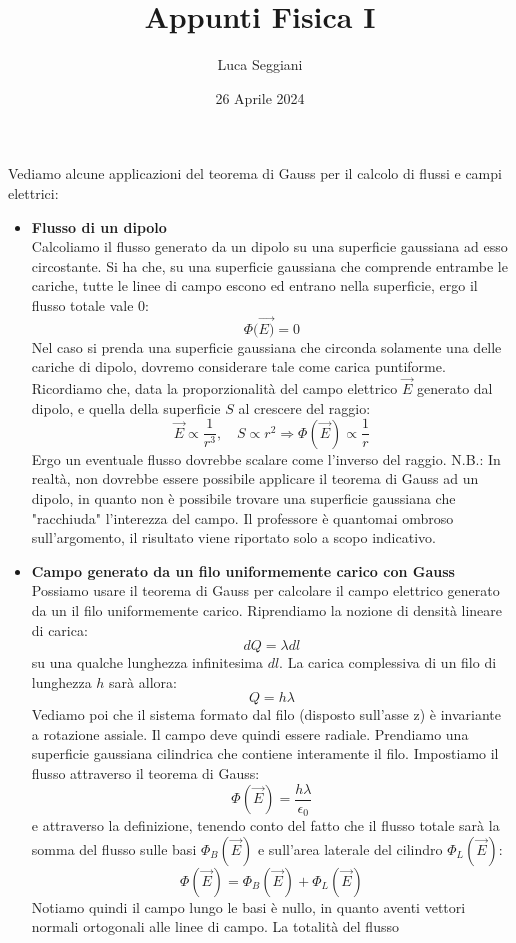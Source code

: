 \documentclass[a4paper,12pt]{article}
\title{Appunti Fisica I}
\author{Luca Seggiani}
\date{26 Aprile 2024}
\begin{document}
\maketitle
\par\medskip
Vediamo alcune applicazioni del teorema di Gauss per il calcolo di flussi e campi elettrici:
\begin{itemize}
  \item \textbf{Flusso di un dipolo} \\
Calcoliamo il flusso generato da un dipolo su una superficie gaussiana ad esso circostante. Si ha che, su una superficie
gaussiana che comprende entrambe le cariche, tutte le linee di campo escono ed entrano nella superficie, ergo il flusso
totale vale 0:
$$ \Phi(\vec{E)} = 0 $$
Nel caso si prenda una superficie gaussiana che circonda solamente una delle cariche di dipolo, dovremo considerare tale come carica
puntiforme. Ricordiamo che, data la proporzionalità del campo elettrico $\vec{E}$ generato dal dipolo, e quella della superficie $S$ al crescere
del raggio:
$$ \vec{E} \propto \frac{1}{r^3}, \quad S \propto r^2 \Rightarrow \Phi(\vec{E}) \propto \frac{1}{r} $$
Ergo un eventuale flusso dovrebbe scalare come l'inverso del raggio.
N.B.: In realtà, non dovrebbe essere possibile applicare il teorema di Gauss ad un dipolo, in quanto non è possibile
trovare una superficie gaussiana che "racchiuda" l'interezza del campo. Il professore è quantomai ombroso sull'argomento, il risultato
viene riportato solo a scopo indicativo.
\item \textbf{Campo generato da un filo uniformemente carico con Gauss} \\
Possiamo usare il teorema di Gauss per calcolare il campo elettrico generato da un il filo uniformemente carico. 
Riprendiamo la nozione di densità lineare di carica:
$$ dQ = \lambda dl $$
su una qualche lunghezza infinitesima $dl$. La carica complessiva di un filo di lunghezza $h$ sarà allora: 
$$ Q=h\lambda $$
Vediamo poi che il sistema formato dal filo (disposto sull'asse z) è invariante a rotazione assiale. Il campo
deve quindi essere radiale. Prendiamo una superficie gaussiana cilindrica che contiene interamente il filo.
Impostiamo il flusso attraverso il teorema di Gauss:
$$ \Phi(\vec{E}) = \frac{h\lambda}{\epsilon_0} $$
e attraverso la definizione, tenendo conto del fatto che il flusso totale sarà la somma del flusso sulle basi $\Phi_B(\vec{E})$ e sull'area
laterale del cilindro $\Phi_L(\vec{E})$:
$$ \Phi(\vec{E}) = \Phi_B(\vec{E}) + \Phi_L(\vec{E}) $$
Notiamo quindi il campo lungo le basi è nullo, in quanto aventi vettori normali ortogonali alle linee di campo. La totalità del flusso

\end{itemize}
\end{document}
